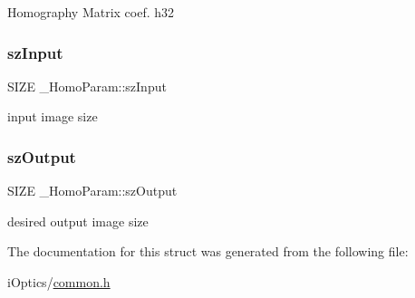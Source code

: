 Homography Matrix coef. h32 \mbox{\label{struct___homo_param_ad4ae576eb7ce7447d24027227f39212e}} 
\subsubsection{\texorpdfstring{sz\+Input}{szInput}}
{\footnotesize\ttfamily S\+I\+ZE \+\_\+\+Homo\+Param\+::sz\+Input}

input image size \mbox{\label{struct___homo_param_a2867aab6560d4a6ed0299cb425acdd75}} 
\subsubsection{\texorpdfstring{sz\+Output}{szOutput}}
{\footnotesize\ttfamily S\+I\+ZE \+\_\+\+Homo\+Param\+::sz\+Output}

desired output image size 

The documentation for this struct was generated from the following file\+:\begin{DoxyCompactItemize}
\item 
i\+Optics/\mbox{\hyperlink{common_8h}{common.\+h}}\end{DoxyCompactItemize}
